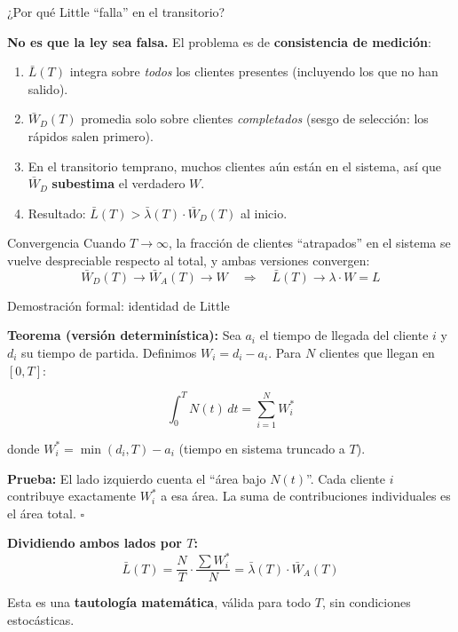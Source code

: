\documentclass[aspectratio=1610, 9pt]{beamer}
\begin{document}
\begin{frame}{¿Por qué Little ``falla'' en el transitorio?}

\textbf{No es que la ley sea falsa.} El problema es de \textbf{consistencia de medición}:

\vspace{0.3cm}
\begin{enumerate}
    \item \textbf{$\bar{L}(T)$} integra sobre \textit{todos} los clientes presentes (incluyendo los que no han salido).
    
    \vspace{0.2cm}
    \item \textbf{$\bar{W}_D(T)$} promedia solo sobre clientes \textit{completados} (sesgo de selección: los rápidos salen primero).
    
    \vspace{0.2cm}
    \item En el transitorio temprano, muchos clientes aún están en el sistema, así que $\bar{W}_D$ \textbf{subestima} el verdadero $W$.
    
    \vspace{0.2cm}
    \item Resultado: $\bar{L}(T) > \bar{\lambda}(T) \cdot \bar{W}_D(T)$ al inicio.
\end{enumerate}

\vspace{0.3cm}
\begin{block}{Convergencia}
Cuando $T \to \infty$, la fracción de clientes ``atrapados'' en el sistema se vuelve despreciable respecto al total, y ambas versiones convergen:
\[
\bar{W}_D(T) \to \bar{W}_A(T) \to W \quad \Rightarrow \quad \bar{L}(T) \to \lambda \cdot W = L
\]
\end{block}
\end{frame}

\begin{frame}{Demostración formal: identidad de Little}

\textbf{Teorema (versión determinística):} Sea $a_i$ el tiempo de llegada del cliente $i$ y $d_i$ su tiempo de partida. Definimos $W_i = d_i - a_i$. Para $N$ clientes que llegan en $[0,T]$:

\[
\int_0^T N(t)\,dt = \sum_{i=1}^{N} W_i^*
\]

donde $W_i^* = \min(d_i, T) - a_i$ (tiempo en sistema truncado a $T$).

\vspace{0.2cm}
\textbf{Prueba:} El lado izquierdo cuenta el ``área bajo $N(t)$''. Cada cliente $i$ contribuye exactamente $W_i^*$ a esa área. La suma de contribuciones individuales es el área total. $\square$

\vspace{0.2cm}
\textbf{Dividiendo ambos lados por $T$:}
\[
\bar{L}(T) = \frac{N}{T} \cdot \frac{\sum W_i^*}{N} = \bar{\lambda}(T) \cdot \bar{W}_A(T)
\]

Esta es una \textbf{tautología matemática}, válida para todo $T$, sin condiciones estocásticas.
\end{frame}
\end{document}
